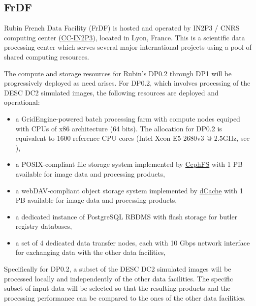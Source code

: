 \subsection{FrDF}

Rubin French Data Facility (FrDF) is hosted and operated by IN2P3 / CNRS
computing center (\href{https://cc.in2p3.fr/en/}{CC-IN2P3}),
located in Lyon, France. This is a scientific data processing center which
serves several major international projects using a pool of shared computing
resources.

The compute and storage resources for Rubin's DP0.2 through DP1 will be
progressively deployed as need arises. For DP0.2, which involves processing of
the DESC DC2 simulated images, the following resources are deployed and
operational:

\begin{itemize}
\item a GridEngine-powered batch processing farm with compute nodes equiped
with CPUs of x86 architecture (64 bits). The allocation for DP0.2 is equivalent
to 1600 reference CPU cores (Intel Xeon E5-2680v3 @ 2.5GHz, see 
),
\item a POSIX-compliant file storage system implemented by 
\href{https://docs.ceph.com/en/latest/cephfs/index.html}{CephFS} with 1 PB 
available for image data and processing products,
\item a webDAV-compliant object storage system implemented by 
\href{https://www.dcache.org}{dCache} with 1 PB available for image data and
processing products,
\item a dedicated instance of PostgreSQL RBDMS with flash storage for butler
registry databases,
\item a set of 4 dedicated data transfer nodes, each with 10 Gbps network
interface for exchanging data with the other data facilities,
\end{itemize}

Specifically for DP0.2, a subset of the DESC DC2 simulated images will be
processed locally and independently of the other data facilities. The specific
subset of input data will be selected so that the resulting products and the
processing performance can be compared to the ones of the other data facilities.
